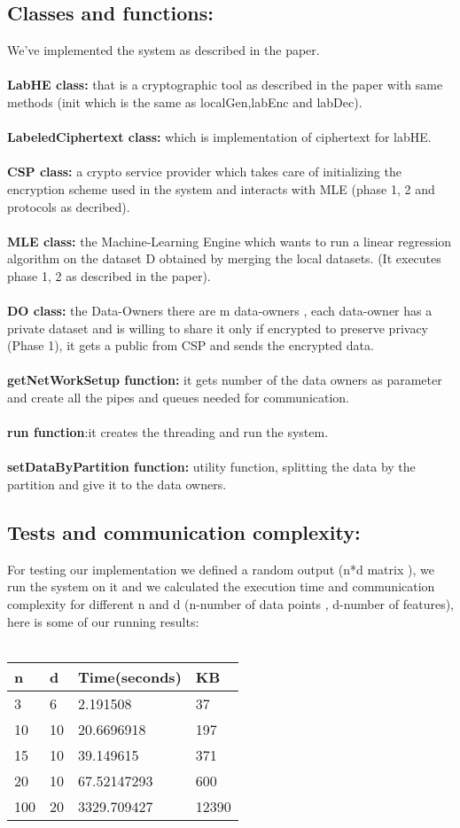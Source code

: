 \documentclass[12pt]{article}
\begin{document}
\subsection{Classes and functions:}
We've implemented the system as described in the paper.
\\ \\ \textbf{LabHE class:} that is a cryptographic tool as described in the paper with same methods (init which is the same as localGen,labEnc and labDec).
\\ \\ \textbf{LabeledCiphertext class:} which is  implementation of ciphertext for labHE.
\\ \\ \textbf{CSP class:} a crypto service provider which takes care of initializing the encryption scheme used in the system and interacts with MLE (phase 1, 2 and protocols as decribed).
\\ \\ \textbf{MLE class:} the Machine-Learning Engine which wants to run a linear regression
algorithm on the dataset D obtained by merging the local datasets. (It executes phase 1, 2 as described in the paper).
\\ \\ \textbf{DO class:} the Data-Owners there are m data-owners , each data-owner has a
private dataset  and is willing to share it only if encrypted to preserve privacy (Phase 1), it gets a public from CSP and sends the encrypted data.
\\ \\ \textbf{getNetWorkSetup function:} it gets number of the data owners as parameter and create all the pipes and queues needed for communication.
\\ \\ \textbf{run function}:it creates the threading and run the system.
\\ \\ \textbf{setDataByPartition function:} utility function, splitting the data by the partition and give it to the data owners.
\subsection{Tests and communication complexity:}
For testing our implementation we defined a random output (n*d matrix ), we run the system on it and we calculated the execution time and communication complexity for different n and d (n-number of data points , d-number of features), here is some of our running results: \\
\\
\begin{tabular}{ |p{3cm}|p{3cm}|p{3cm}| p{3cm}|}
\hline
\textbf{n} & \textbf{d} & \textbf{Time(seconds)} & \textbf{KB} \\
\hline
3 & 6 &  2.191508 & 37\\
\hline
10 & 10 & 20.6696918 & 197\\
\hline
15 & 10 & 39.149615 & 371\\
\hline
20 & 10 & 67.52147293 & 600\\
\hline
100 & 20 &  3329.709427 & 12390\\
\hline
\end{tabular}
\end{document}
